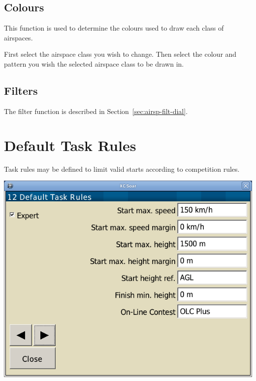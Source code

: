 \subsection*{Colours}
This function is used to determine the colours used to draw each class of
airspaces.

First select the airspace class you wish to change. Then select the colour and 
pattern you wish the selected airspace class to be drawn in.

\subsection*{Filters}
The filter function is described in Section~\ref{sec:airsp-filt-dial}.


\clearpage
\section{Default Task Rules}

Task rules may be defined to limit valid starts according to competition
rules. \label{conf:taskrules}

\begin{center}
\includegraphics[angle=0,width=0.8\linewidth,keepaspectratio='true']{figures/config-rules.png}
\end{center}

